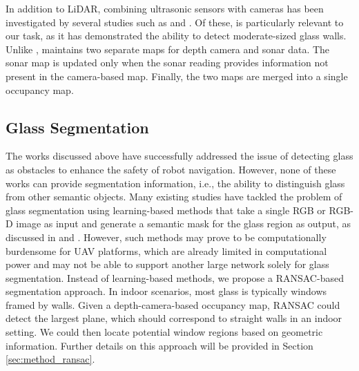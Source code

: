 In addition to LiDAR, combining ultrasonic sensors with cameras has been investigated by several studies such as \cite{camerafusion} and \cite{obsavoid}. Of these, \cite{camerafusion} is particularly relevant to our task, as it has demonstrated the ability to detect moderate-sized glass walls. Unlike \cite{lidarfusion}, \cite{camerafusion} maintains two separate maps for depth camera and sonar data. The sonar map is updated only when the sonar reading provides information not present in the camera-based map. Finally, the two maps are merged into a single occupancy map. 

\subsection{Glass Segmentation}
The works discussed above have successfully addressed the issue of detecting glass as obstacles to enhance the safety of robot navigation. However, none of these works can provide segmentation information, i.e., the ability to distinguish glass from other semantic objects. Many existing studies have tackled the problem of glass segmentation using learning-based methods that take a single RGB or RGB-D image as input and generate a semantic mask for the glass region as output, as discussed in \cite{depthaware} and \cite{donthit}. However, such methods may prove to be computationally burdensome for UAV platforms, which are already limited in computational power and may not be able to support another large network solely for glass segmentation. Instead of learning-based methods, we propose a RANSAC-based segmentation approach. In indoor scenarios, most glass is typically windows framed by walls. Given a depth-camera-based occupancy map, RANSAC could detect the largest plane, which should correspond to straight walls in an indoor setting. We could then locate potential window regions based on geometric information. Further details on this approach will be provided in Section \ref{sec:method_ransac}.